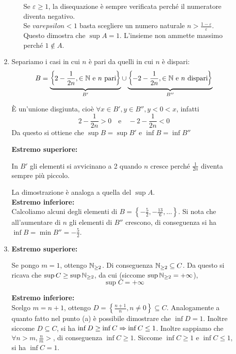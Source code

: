 \documentclass{article}
\begin{document}
\begin{enumerate}[label=\textbf{Esercizio 3.\arabic*.},itemindent=*]
\begin{enumerate}
\begin{itemize}
            Se $\varepsilon \geq 1$, la disequazione è sempre verificata perché il numeratore diventa negativo. \\Se $varepsilon<1$ basta scegliere un numero naturale $n>\frac{1-\varepsilon}{\varepsilon}$.\\Questo dimostra che $\sup A=1$. L'insieme non ammette massimo perché $1\notin A$.
        \end{itemize}
        \item Separiamo i casi in cui $n$ è pari da quelli in cui $n$ è dispari:
        \[B=\underbrace{\left\{2-\frac{1}{2n}, \in \mathbb{N} \text{ e }n\text{ pari}\right\}}_{B'}\cup\underbrace{\left\{-2-\frac{1}{2n}, \in \mathbb{N} \text{ e }n\text{ dispari}\right\}}_{B''}\]
        \begin{oss}
            È un'unione disgiunta, cioè $\forall x \in B', y\in B'', y<0<x$, infatti 
                \[2-\frac{1}{2n}>0\text{~~ e ~~}-2-\frac{1}{2n}<0\]
            Da questo si ottiene che $\sup B=\sup B'$ e $\inf B=\inf B''$     
        \end{oss}
        \textbf{Estremo superiore:}
        \begin{oss}
            In $B'$ gli elementi si avvicinano a 2 quando $n$ cresce perché $\frac{1}{2n}$ diventa sempre più piccolo. 
        \end{oss}
        La dimostrazione è analoga a quella del $\sup A$.\\
        \textbf{Estremo inferiore:}\\
        Calcoliamo alcuni degli elementi di $B=\left\{-\frac{5}{2},-\frac{13}{6},\dots\right\}$. Si nota che all'aumentare di $n$ gli elementi di $B''$ crescono, di conseguenza si ha $\inf B=\min B''= -\frac{5}{2}$.
        \item \textbf{Estremo superiore:}
        \begin{oss}
            Se pongo $m=1$, ottengo $\mathbb{N}_{\geq2}$. Di conseguenza $\mathbb{N}_{\geq2}\subseteq C$. Da questo si ricava che $\sup C\geq \sup \mathbb{N}_{\geq 2}$, da cui (siccome $\sup \mathbb{N}_{\geq 2}=+\infty$), \[\sup C=+\infty\]
        \end{oss}
        \textbf{Estremo inferiore:}\\
        Scelgo $m=n+1$, ottengo $D=\left\{\frac{n+1}{n}, n\neq 0\right\}\subseteq C$. Analogamente a quanto fatto nel punto (a) è possibile dimostrare che $\inf D=1$. Inoltre siccome $D\subseteq C$, si ha $\inf D\geq \inf C\Rightarrow \inf C\leq 1$. Inoltre sappiamo che $\forall n> m, \frac{n}{m}>$, di conseguenza $\inf C\geq 1$. Siccome $\inf C\geq 1$ e $\inf C \leq 1$, si ha $\inf C=1$.
    \end{enumerate}
    

\end{enumerate}
\end{document}
